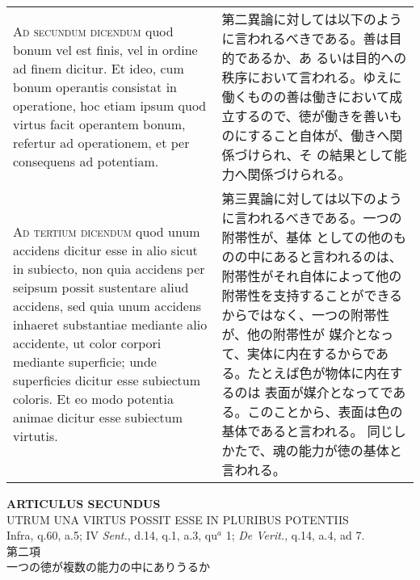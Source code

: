 \documentclass[10pt]{jsarticle}
\begin{document}
\begin{longtable}{p{21em}p{21em}}
\\

{\scshape Ad secundum dicendum} quod bonum vel est finis, vel in
ordine ad finem dicitur. Et ideo, cum bonum operantis consistat in
operatione, hoc etiam ipsum quod virtus facit operantem bonum,
refertur ad operationem, et per consequens ad potentiam.

&

第二異論に対しては以下のように言われるべきである。善は目的であるか、あ
るいは目的への秩序において言われる。ゆえに働くものの善は働きにおいて成
立するので、徳が働きを善いものにすること自体が、働きへ関係づけられ、そ
の結果として能力へ関係づけられる。

\\

{\scshape Ad tertium dicendum} quod unum accidens dicitur esse in alio
sicut in subiecto, non quia accidens per seipsum possit sustentare
aliud accidens, sed quia unum accidens inhaeret substantiae mediante
alio accidente, ut color corpori mediante superficie; unde superficies
dicitur esse subiectum coloris. Et eo modo potentia animae dicitur
esse subiectum virtutis.

&

第三異論に対しては以下のように言われるべきである。一つの附帯性が、基体
としての他のものの中にあると言われるのは、附帯性がそれ自体によって他の
附帯性を支持することができるからではなく、一つの附帯性が、他の附帯性が
媒介となって、実体に内在するからである。たとえば色が物体に内在するのは
表面が媒介となってである。このことから、表面は色の基体であると言われる。
同じしかたで、魂の能力が徳の基体と言われる。

\end{longtable}
\newpage

\begin{center}
{\Large {\bf ARTICULUS SECUNDUS}}\\
{\large UTRUM UNA VIRTUS POSSIT ESSE IN PLURIBUS POTENTIIS}\\
{\footnotesize Infra, q.60, a.5; IV {\itshape Sent.}, d.14, q.1, a.3, qu$^{a}$ 1; {\itshape De Verit.}, q.14, a.4, ad 7.}\\
{\Large 第二項\\一つの徳が複数の能力の中にありうるか}
\end{center}
\end{document}
